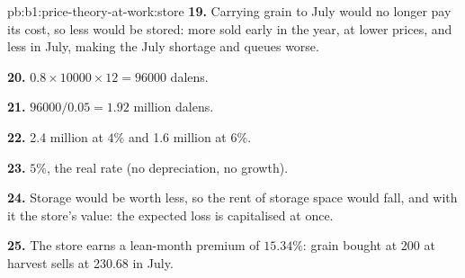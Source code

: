 \begin{solution}{pb:b1:price-theory-at-work:store}
\textbf{19.} Carrying grain to July would no longer pay its cost, so less
would be stored: more sold early in the year, at lower prices, and less in
July, making the July shortage and queues worse.

\textbf{20.} $0.8 \times 10000 \times 12 = 96000$ dalens.

\textbf{21.} $96000/0.05 = 1.92$ million dalens.

\textbf{22.} 2.4 million at $4\%$ and 1.6 million at $6\%$.

\textbf{23.} $5\%$, the real rate (no depreciation, no growth).

\textbf{24.} Storage would be worth less, so the rent of storage space
would fall, and with it the store's value: the expected loss is
capitalised at once.

\textbf{25.} The store earns a lean-month premium of $15.34\%$: grain bought at
200 at harvest sells at 230.68 in July.
\end{solution}
